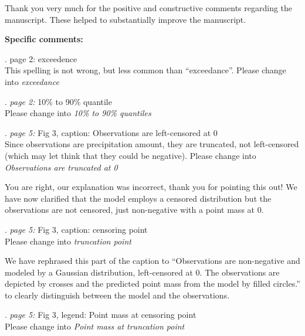\documentclass[american,foldmarks=false,noconfig]{uibklttr}
\newenvironment{review}{\fontshape{\itdefault}\fontseries{\bfdefault} \selectfont \smallskip}{\par}
\begin{document}
Thank you very much for the positive and constructive 
comments regarding the manuscript. These helped to 
substantially improve the manuscript.

\bigskip

\textbf{Specific comments:}

\begin{review}
1. {\color{quotecolor} page 2: exceedence}\\
This spelling is not wrong, but less common than ``exceedance''.
Please change into \textit{exceedance}
\end{review}

\begin{review}
2. {\color{quotecolor}\textit{page 2:} 10$\%$ to 90\% quantile}\\
Please change into \textit{10\% to 90\% quantiles}
\end{review}

\begin{review}
3. {\color{quotecolor}\textit{page 5:} Fig 3, caption: Observations 
are left-censored at 0}\\
Since observations are precipitation amount, they are truncated, not 
left-censored (which may let think that they could be negative). 
Please change into \textit{Observations are truncated at 0}
\end{review}

You are right, our explanation was incorrect, thank you for pointing
this out! We have now clarified that the model employs a censored
distribution but the observations are not censored, just non-negative
with a point mass at 0.


\begin{review}
4. {\color{quotecolor}\textit{page 5:} Fig 3, caption: censoring point}\\
Please change into \textit{truncation point}
\end{review}

We have rephrased this part of the caption to ``Observations are non-negative 
and modeled by a Gaussian distribution, left-censored at 0.
The observations are depicted by crosses and the predicted point mass
from the model by filled circles.'' to clearly distinguish between the model
and the observations.


\begin{review}
5. {\color{quotecolor}\textit{page 5:} Fig 3, legend: Point mass at 
censoring point}\\
Please change into \textit{Point mass at truncation point}
\end{review}
\end{document}
